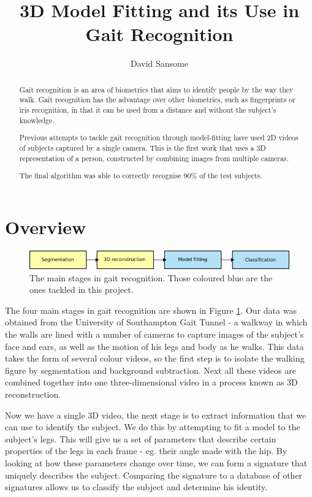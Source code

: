 \documentclass[a4paper,12pt]{article}
\title{3D Model Fitting and its Use in Gait Recognition}
\author{David Sansome}
\begin{document}


\maketitle

\begin{abstract}
	Gait recognition is an area of biometrics that aims to identify people by the way they walk.
	Gait recognition has the advantage over other biometrics, such as fingerprints or iris recognition, in that it can be used from a distance and without the subject's knowledge.
	
	Previous attempts to tackle gait recognition through model-fitting have used 2D videos of subjects captured by a single camera.
	This is the first work that uses a 3D representation of a person, constructed by combining images from multiple cameras.
	
	The final algorithm was able to correctly recognise 90\% of the test subjects.
\end{abstract}

\tableofcontents


\newpage
\section{Overview}

\begin{figure}[b]
	\centering
	\includegraphics[width=12cm]{../report/overview.png}
	\caption{The main stages in gait recognition.
		Those coloured blue are the ones tackled in this project.}
	\label{OverviewBoxes}
\end{figure}

The four main stages in gait recognition are shown in Figure \ref{OverviewBoxes}.
Our data was obtained from the University of Southampton Gait Tunnel -
a walkway in which the walls are lined with a number of cameras to capture images of the subject's face and ears, as well as the motion of his legs and body as he walks.
This data takes the form of several colour videos, so the first step is to isolate the walking figure by segmentation and background subtraction.
Next all these videos are combined together into one three-dimensional video in a process known as 3D reconstruction.

Now we have a single 3D video, the next stage is to extract information that we can use to identify the subject.
We do this by attempting to fit a model to the subject's legs.
This will give us a set of parameters that describe certain properties of the legs in each frame - eg. their angle made with the hip.
By looking at how these parameters change over time, we can form a signature that uniquely describes the subject.
Comparing the signature to a database of other signatures allows us to classify the subject and determine his identity.
\end{document}
